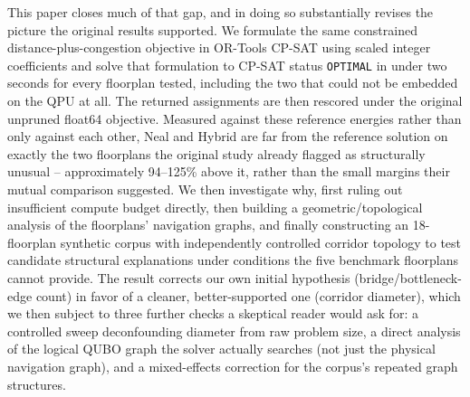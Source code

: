 \documentclass[11pt]{article}
\begin{document}
This paper closes much of that gap, and in doing so substantially revises the picture the original results supported. We formulate the same constrained distance-plus-congestion objective in OR-Tools CP-SAT using scaled integer coefficients and solve that formulation to CP-SAT status \texttt{OPTIMAL} in under two seconds for every floorplan tested, including the two that could not be embedded on the QPU at all. The returned assignments are then rescored under the original unpruned float64 objective. Measured against these reference energies rather than only against each other, Neal and Hybrid are far from the reference solution on exactly the two floorplans the original study already flagged as structurally unusual -- approximately 94--125\% above it, rather than the small margins their mutual comparison suggested. We then investigate why, first ruling out insufficient compute budget directly, then building a geometric/topological analysis of the floorplans' navigation graphs, and finally constructing an 18-floorplan synthetic corpus with independently controlled corridor topology to test candidate structural explanations under conditions the five benchmark floorplans cannot provide. The result corrects our own initial hypothesis (bridge/bottleneck-edge count) in favor of a cleaner, better-supported one (corridor diameter), which we then subject to three further checks a skeptical reader would ask for: a controlled sweep deconfounding diameter from raw problem size, a direct analysis of the logical QUBO graph the solver actually searches (not just the physical navigation graph), and a mixed-effects correction for the corpus's repeated graph structures.
\end{document}
